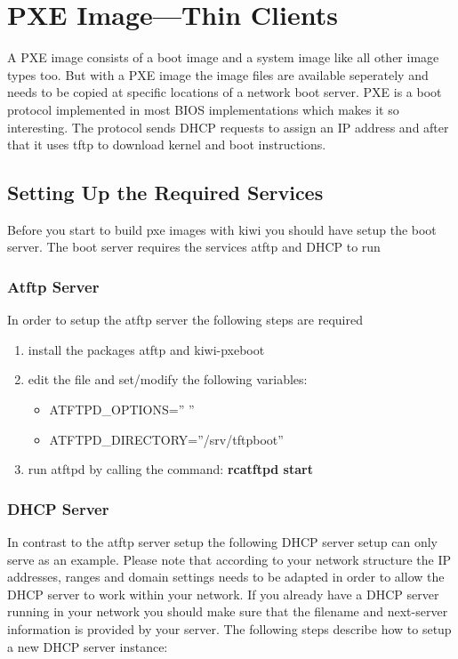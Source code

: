 \chapter{PXE Image---Thin Clients}
\label{chapter:pxe}
\minitoc

A PXE image consists of a boot image and a system image like all other
image types too. But with a PXE image the image files are available
seperately and needs to be copied at specific locations of a network
boot server. PXE is a boot protocol implemented in most BIOS implementations
which makes it so interesting. The protocol sends DHCP requests to assign
an IP address and after that it uses tftp to download kernel and boot
instructions. 

\section{Setting Up the Required Services}

Before you start to build pxe images with kiwi you
should have setup the boot server. The boot server requires the
services atftp and DHCP to run

\subsection{Atftp Server}

In order to setup the atftp server the following steps are required

\begin{enumerate}
\item install the packages atftp and kiwi-pxeboot
\item edit the file  and set/modify the following
      variables:
      \begin{itemize}
      \item ATFTPD\_OPTIONS='' ''
      \item ATFTPD\_DIRECTORY=''/srv/tftpboot''
      \end{itemize}
\item run atftpd by calling the command:
      \textbf{rcatftpd start}
\end{enumerate}

\subsection{DHCP Server}
In contrast to the atftp server setup the following DHCP server setup
can only serve as an example. Please note that according to your network
structure the IP addresses, ranges and domain settings needs to be adapted
in order to allow the DHCP server to work within your network. If you
already have a DHCP server running in your network you should make sure
that the filename and next-server information is provided by your server.
The following steps describe how to setup a new DHCP server instance:

